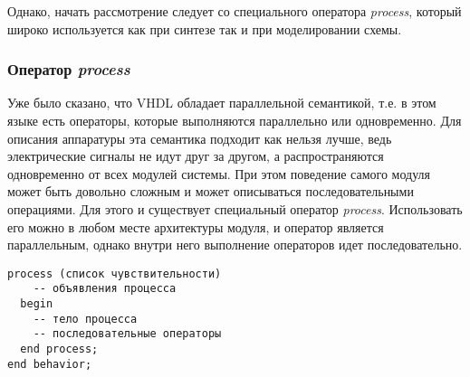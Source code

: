 Однако, начать рассмотрение следует со специального оператора \emph{process}, который широко используется как при синтезе так и при моделировании схемы. 

\subsubsection{Оператор \emph{process}}

Уже было сказано, что VHDL обладает параллельной семантикой, т.е. в этом языке есть операторы, которые выполняются параллельно или одновременно. Для описания аппаратуры эта семантика подходит как нельзя лучше, ведь электрические сигналы не идут друг за другом, а распространяются одновременно от всех модулей системы. При этом поведение самого модуля может быть довольно сложным и может описываться последовательными операциями. Для этого и существует специальный оператор \emph{process}. Использовать его можно в любом месте архитектуры модуля, и оператор является параллельным, однако внутри него выполнение операторов идет последовательно. 


\begin{Code}
\begin{lstlisting}[caption=Оператор \emph{process},label=process_1]
  process (список чувствительности)
    -- объявления процесса
  begin
    -- тело процесса
    -- последовательные операторы
  end process;
end behavior;
\end{lstlisting}
\end{Code}

